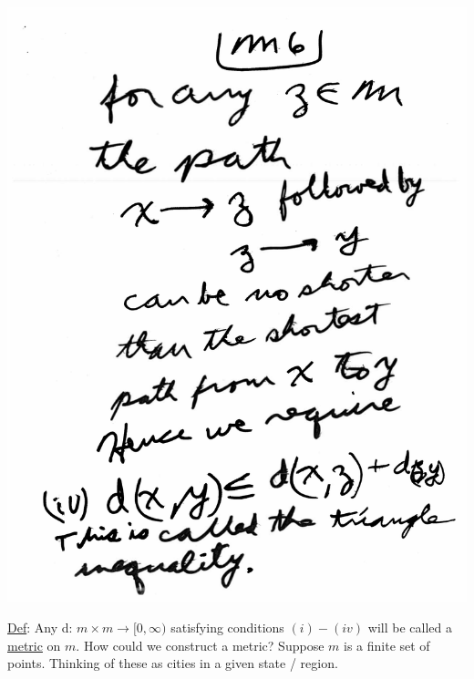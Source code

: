 \documentclass[10pt,a4paper]{article}
\begin{document}
\includegraphics[scale=.5]{Pages/MS_6}

\newpage

\underline{Def}: Any d: $m \times m \rightarrow [0,\infty)$ satisfying conditions $(i) - (iv)$ will be called a \underline{metric} on $m$. How could we construct a metric? Suppose $m$ is a finite set of points. Thinking of these as cities in a given state / region. 
\end{document}
